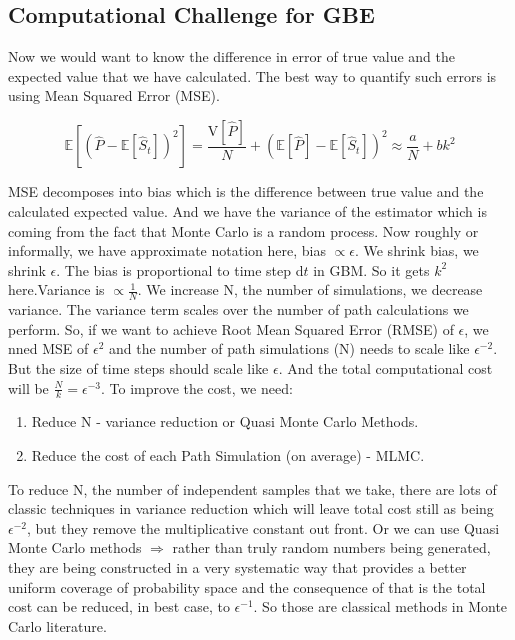 \documentclass[12pt]{article}
\newcommand{\E}{\mathbb{E}}
\begin{document}
\subsection{Computational Challenge for GBE}

Now we would want to know the difference in error of true value and the expected value that we have calculated. The best way to quantify such errors is using Mean Squared Error (MSE). 

\begin{equation}
 \E[ ( \hat{P} - \E[\hat{S}_t] )^2 ] = \frac{\text{V}[\hat{P}]}{N} +  ( \E[\hat{P}] - \E[\hat{S}_t] )^2 \approx \frac{a}{N} + bk^2 
\end{equation}
 

MSE decomposes into bias which is the difference between true value and the calculated expected value. And we have the variance of the estimator which is coming from the fact that Monte Carlo is a random process. Now roughly or informally, we have approximate notation here, bias $\propto \epsilon$. We shrink bias, we shrink $\epsilon$. The bias is proportional to time step d$t$ in GBM. So it gets $k^2$ here.Variance is $\propto \frac{1}{N}$. We increase N, the number of simulations, we decrease variance. The variance term scales over the number of path calculations we perform. So, if we want to achieve Root Mean Squared Error (RMSE) of $\epsilon$, we nned MSE of $\epsilon^2$ and the number of path simulations (N) needs to scale like $\epsilon^{-2}$. But the size of time steps should scale like $\epsilon$. And the total computational cost will be $\frac{N}{k} = \epsilon^{-3}$. To improve the cost, we need:

\begin{enumerate}[label=\alph*]
\item Reduce N - variance reduction or Quasi Monte Carlo Methods.
\item Reduce the cost of each Path Simulation (on average) - MLMC.
\end{enumerate}

To reduce N, the number of independent samples that we take, there are lots of classic techniques in variance reduction which will leave total cost still as being $\epsilon^{-2}$, but they remove the multiplicative constant out front. Or we can use Quasi Monte Carlo methods $\Rightarrow$ rather than truly random numbers being generated, they are being constructed in a very systematic way that provides a better uniform coverage of probability space and the consequence of that is the total cost can be reduced, in best case, to $\epsilon^{-1}$. So those are classical methods in Monte Carlo literature.
\end{document}
